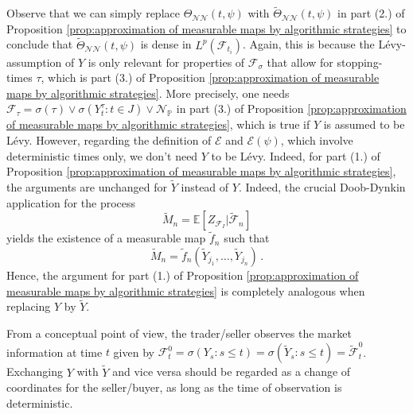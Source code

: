 \documentclass[11pt,a4paper,twoside,openany]{report}
\numberwithin{equation}{section}
\theoremstyle{plain} %
\theoremstyle{definition} %
\theoremstyle{remark} %
\begin{document}
 
 Observe that we can simply replace \({\Theta}_{\mathcal{NN}}(t,\psi)\) with \(\widetilde{\Theta}_{\mathcal{NN}}(t,\psi)\) in part (2.) of  Proposition \ref{prop:approximation of measurable maps by algorithmic strategies} to conclude that \(\widetilde{\Theta}_{\mathcal{NN}}(t,\psi)\) is dense in \(L^p({\mathcal{F}_{t_i}})\). Again, this is because the Lévy-assumption of \(Y\) is only relevant for properties of \(\mathcal{F}_{\sigma}\) that allow for stopping-times \(\tau\), which is part (3.) of Proposition \ref{prop:approximation of measurable maps by algorithmic strategies}. More precisely, one needs \(\mathcal{F}_{\tau}=\sigma(\tau)\vee\sigma(Y_t^{\tau}:t\in J)\vee\mathcal{N}_{\mathbb{P}}\) in part (3.) of Proposition \ref{prop:approximation of measurable maps by algorithmic strategies}, which is true if \(Y\) is assumed to be Lévy. However, regarding the definition of \(\mathcal{E}\) and \(\mathcal{E}(\psi)\), which involve deterministic times only, we don't need \(Y\) to be Lévy. Indeed, for part (1.) of Proposition \ref{prop:approximation of measurable maps by algorithmic strategies}, the arguments are unchanged for \(\widetilde{Y}\) instead of \(Y\). Indeed, the crucial Doob-Dynkin application for the process 
 \begin{equation*}
     \widetilde{M}_n=\mathbb{E}[Z_{\mathcal{F}_I}|\widetilde{\mathcal{F}}_n]
 \end{equation*}
 yields the existence of a measurable map \(\widetilde{f}_n\) such that
 \begin{equation*}
      \widetilde{M}_n=\widetilde{f}_n(\widetilde{Y}_{j_1},\dots,\widetilde{Y}_{j_n})\,.
 \end{equation*}
 Hence, the argument for part (1.) of Proposition \ref{prop:approximation of measurable maps by algorithmic strategies} is  completely analogous when replacing \(Y\) by \(\widetilde{Y}\).
 
 
 From a conceptual point of view, the trader/seller observes the market information at time \(t\) given by \(\mathcal{F}_t^0=\sigma(Y_s:s\leq t)=\sigma(\widetilde{Y}_s:s\leq t)=\widetilde{\mathcal{F}}_t^0\). Exchanging \(Y\) with \(\widetilde{Y}\) and vice versa should  be regarded as a change of coordinates for the seller/buyer, as long as the time of observation is deterministic. 
\end{document}
